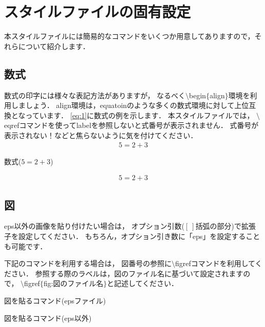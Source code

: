 \section{スタイルファイルの固有設定}
\label{sec:master}
本スタイルファイルには簡易的なコマンドをいくつか用意してありますので，それらについて紹介します．

\subsection{数式}
数式の印字には様々な表記方法がありますが，
なるべく$\setminus$begin$\{$align$\}$環境を利用しましょう．
align環境は，equatoinのような多くの数式環境に対して上位互換となっています．
\eqref{eq:1}に数式の例を示します．
本スタイルファイルでは，
$\setminus$eqrefコマンドを使ってlabelを参照しないと式番号が表示されません．
式番号が表示されない！などと焦らないように気を付けてください．
%
\begin{align}
	5 = 2 + 3
	\label{eq:1}
\end{align}
%
\begin{lstbox}{数式($5=2+3$)}
\begin{minilst}
\begin{align}
	5 = 2 + 3
	\label{eq:1}
\end{align}
\end{minilst}
\end{lstbox}

\subsection{図}
eps以外の画像を貼り付けたい場合は，
オプション引数($[\ ]$括弧の部分)で拡張子を設定してください．
もちろん，オプション引き数に「eps」を設定することも可能です．

下記のコマンドを利用する場合は，
図番号の参照に$\setminus$figrefコマンドを利用してください．
参照する際のラベルは，図のファイル名に基づいて設定されますので，
$\setminus$figref$\{$fig:図のファイル名$\}$と記述してください．
%
\begin{lstbox}{図を貼るコマンド(epsファイル)}
\begin{minilst}
\end{minilst}
\end{lstbox}
%
\begin{lstbox}{図を貼るコマンド(eps以外)}
\begin{minilst}
\end{minilst}
\end{lstbox}


